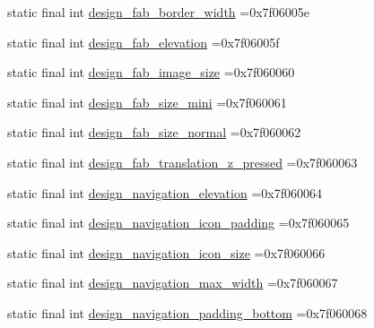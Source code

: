 \begin{DoxyCompactItemize}
\item 
static final int \mbox{\hyperlink{classbr_1_1unb_1_1cic_1_1mp_1_1marketmaster_1_1test_1_1R_1_1dimen_abf7f9e9058a2b10b614b24899fd4ed1e}{design\+\_\+fab\+\_\+border\+\_\+width}} =0x7f06005e
\item 
static final int \mbox{\hyperlink{classbr_1_1unb_1_1cic_1_1mp_1_1marketmaster_1_1test_1_1R_1_1dimen_a7ee49c8dbe89d0367c627a2cea458480}{design\+\_\+fab\+\_\+elevation}} =0x7f06005f
\item 
static final int \mbox{\hyperlink{classbr_1_1unb_1_1cic_1_1mp_1_1marketmaster_1_1test_1_1R_1_1dimen_afb0fe22bc09e470fcd227cc544d9c86c}{design\+\_\+fab\+\_\+image\+\_\+size}} =0x7f060060
\item 
static final int \mbox{\hyperlink{classbr_1_1unb_1_1cic_1_1mp_1_1marketmaster_1_1test_1_1R_1_1dimen_a8500018d711de6db47df9e03ba1b808d}{design\+\_\+fab\+\_\+size\+\_\+mini}} =0x7f060061
\item 
static final int \mbox{\hyperlink{classbr_1_1unb_1_1cic_1_1mp_1_1marketmaster_1_1test_1_1R_1_1dimen_abcf7e543886cf23fe6cc86b768bf1bf2}{design\+\_\+fab\+\_\+size\+\_\+normal}} =0x7f060062
\item 
static final int \mbox{\hyperlink{classbr_1_1unb_1_1cic_1_1mp_1_1marketmaster_1_1test_1_1R_1_1dimen_a1029e4f374f1cf9e0c418017dc5519eb}{design\+\_\+fab\+\_\+translation\+\_\+z\+\_\+pressed}} =0x7f060063
\item 
static final int \mbox{\hyperlink{classbr_1_1unb_1_1cic_1_1mp_1_1marketmaster_1_1test_1_1R_1_1dimen_a02724857a35d837f2d80f692ba8dee4b}{design\+\_\+navigation\+\_\+elevation}} =0x7f060064
\item 
static final int \mbox{\hyperlink{classbr_1_1unb_1_1cic_1_1mp_1_1marketmaster_1_1test_1_1R_1_1dimen_a763ad65d0b26a8257f935650ccbd7f13}{design\+\_\+navigation\+\_\+icon\+\_\+padding}} =0x7f060065
\item 
static final int \mbox{\hyperlink{classbr_1_1unb_1_1cic_1_1mp_1_1marketmaster_1_1test_1_1R_1_1dimen_ad43c52ceb0d821d12d03c34dc249c388}{design\+\_\+navigation\+\_\+icon\+\_\+size}} =0x7f060066
\item 
static final int \mbox{\hyperlink{classbr_1_1unb_1_1cic_1_1mp_1_1marketmaster_1_1test_1_1R_1_1dimen_ab22b39054c0a1e2e6269a52aa7879351}{design\+\_\+navigation\+\_\+max\+\_\+width}} =0x7f060067
\item 
static final int \mbox{\hyperlink{classbr_1_1unb_1_1cic_1_1mp_1_1marketmaster_1_1test_1_1R_1_1dimen_ae788fc78464878448afe0166d095c368}{design\+\_\+navigation\+\_\+padding\+\_\+bottom}} =0x7f060068

\end{DoxyCompactItemize}
